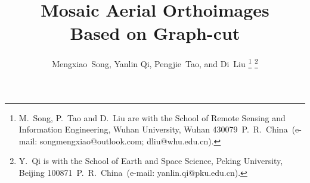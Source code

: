 \documentclass[journal]{IEEEtran}
\begin{document}
%
\title{Mosaic Aerial Orthoimages\\ Based on Graph-cut}
%
%
%

\author{Mengxiao~Song, Yanlin Qi, Pengjie~Tao, and Di~Liu%
\thanks{M.~Song, P.~Tao and D.~Liu are with the School of Remote Sensing and Information Engineering, Wuhan University, Wuhan 430079~P.~R.~China~(e-mail: songmengxiao@outlook.com; dliu@whu.edu.cn).}%
\thanks{Y.~Qi is with the School of Earth and Space Science, Peking University, Beijing 100871~P.~R.~China~(e-mail: yanlin.qi@pku.edu.cn).}%
}

%
%
\end{document}
